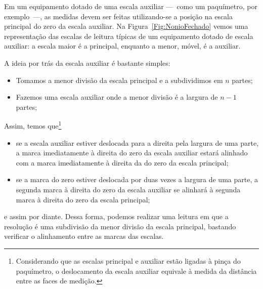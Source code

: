 Em um equipamento dotado de uma escala auxiliar ---~como um paquímetro, por exemplo~---, as medidas devem ser feitas utilizando-se a posição na escala principal do zero da escala auxiliar. Na Figura~\ref{Fig:NonioFechado} vemos uma representação das escalas de leitura típicas de um equipamento dotado de escala auxiliar: a escala maior é a principal, enquanto a menor, móvel, é a auxiliar.

A ideia por trás da escala auxiliar é bastante simples: 
\begin{itemize}
	\item Tomamos a menor divisão da escala principal e a subdividimos em $n$ partes;
	\item Fazemos uma escala auxiliar onde a menor divisão é a largura de $n-1$ partes;
\end{itemize}
%
Assim, temos que\footnote{Considerando que as escalas principal e auxiliar estão ligadas à pinça do paquímetro, o deslocamento da escala auxiliar equivale à medida da distância entre as faces de medição.}
\begin{itemize}
	\item se a escala auxiliar estiver deslocada para a direita pela largura de uma parte, a marca imediatamente à direita do zero da escala auxiliar estará alinhado com a marca imediatamente à direita da do zero da escala principal;
	\item se a marca do zero estiver deslocada por duas vezes a largura de uma parte, a segunda marca à direita do zero da escala auxiliar se alinhará à segunda marca à direita do zero da escala principal;
\end{itemize}
%
e assim por diante. Dessa forma, podemos realizar uma leitura em que a resolução é uma subdivisão da menor divisão da escala principal, bastando verificar o alinhamento entre as marcas das escalas.

\begin{marginfigure}
\centering
{}
\caption{Escala auxiliar deslocada para a direita por um décimo da largura da menor divisão da escala principal. Note que a marca número 1 da escala auxiliar está alinhada com a primeira marca à direita do zero da escala principal. \label{Fig:NonioAbertoUmaParte}}
\end{marginfigure}

